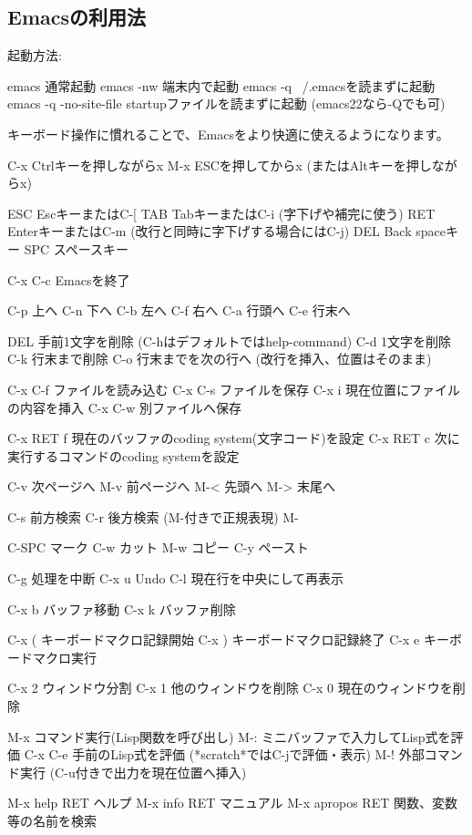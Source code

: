 \documentclass[mingoth,a4paper]{jsarticle}
\begin{document}
\subsection{Emacsの利用法}

起動方法:

\begin{commandline}
emacs                 	通常起動
emacs -nw             	端末内で起動
emacs -q              	~/.emacsを読まずに起動
emacs -q -no-site-file	startupファイルを読まずに起動 (emacs22なら-Qでも可)
\end{commandline}

キーボード操作に慣れることで、Emacsをより快適に使えるようになります。

\begin{commandline}
C-x     Ctrlキーを押しながらx
M-x     ESCを押してからx  (またはAltキーを押しながらx)

ESC     EscキーまたはC-[
TAB     TabキーまたはC-i (字下げや補完に使う)
RET     EnterキーまたはC-m (改行と同時に字下げする場合にはC-j)
DEL     Back spaceキー
SPC     スペースキー

C-x C-c         Emacsを終了

C-p  上へ       C-n  下へ
C-b  左へ       C-f  右へ
C-a  行頭へ     C-e  行末へ

DEL     手前1文字を削除 (C-hはデフォルトではhelp-command)
C-d     1文字を削除
C-k     行末まで削除
C-o     行末までを次の行へ (改行を挿入、位置はそのまま)

C-x C-f         ファイルを読み込む
C-x C-s         ファイルを保存
C-x i           現在位置にファイルの内容を挿入
C-x C-w         別ファイルへ保存

C-x RET f       現在のバッファのcoding system(文字コード)を設定
C-x RET c       次に実行するコマンドのcoding systemを設定

C-v 次ページへ  M-v 前ページへ
M-< 先頭へ      M-> 末尾へ

C-s  前方検索   C-r  後方検索  (M-付きで正規表現)
M-%

C-SPC マーク
C-w カット   M-w コピー   C-y ペースト

C-g     処理を中断
C-x u   Undo
C-l     現在行を中央にして再表示

C-x b バッファ移動   C-x k バッファ削除

C-x (   キーボードマクロ記録開始
C-x )   キーボードマクロ記録終了
C-x e   キーボードマクロ実行

C-x 2   ウィンドウ分割
C-x 1   他のウィンドウを削除
C-x 0   現在のウィンドウを削除

M-x     コマンド実行(Lisp関数を呼び出し)
M-:     ミニバッファで入力してLisp式を評価
C-x C-e 手前のLisp式を評価 (*scratch*ではC-jで評価・表示)
M-!     外部コマンド実行 (C-u付きで出力を現在位置へ挿入)

M-x help RET    ヘルプ
M-x info RET    マニュアル
M-x apropos RET 関数、変数等の名前を検索

\end{commandline}
\end{document}
